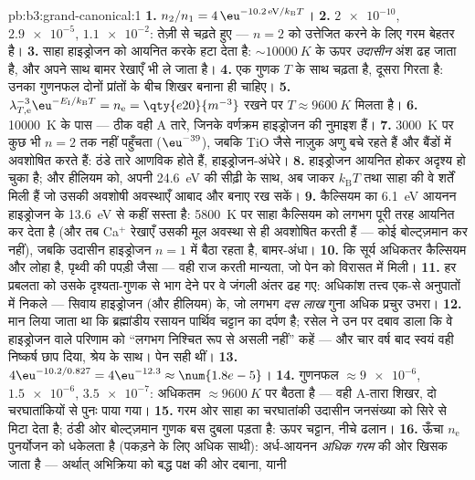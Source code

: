 \begin{solution}{pb:b3:grand-canonical:1}
\textbf{1.} $n_2/n_1 = 4\,\eu^{-10.2\,\text{eV}/k_{\text{B}}T}$।
\textbf{2.} $\num{2e-10}$, $\num{2.9e-5}$, $\num{1.1e-2}$: तेज़ी से
चढ़ते हुए --- $n = 2$ को उत्तेजित करने के लिए गरम बेहतर है।
\textbf{3.} साहा हाइड्रोजन को आयनित करके हटा देता है:
$\sim\qty{10000}{K}$ के ऊपर \emph{उदासीन} अंश ढह जाता है, और अपने
साथ बामर रेखाएँ भी ले जाता है।
\textbf{4.} एक गुणक $T$ के साथ चढ़ता है, दूसरा गिरता है: उनका
गुणनफल दोनों प्रांतों के बीच शिखर बनाना ही चाहिए।
\textbf{5.} $\lambda_{T,\text{e}}^{-3}\eu^{-E_{\text{I}}/
k_{\text{B}}T} = n_{\text{e}} = \qty{e20}{m^{-3}}$ रखने पर $T
\approx \qty{9600}{K}$ मिलता है।
\textbf{6.} \qty{10000}{K} के पास --- ठीक वही A तारे, जिनके
वर्णक्रम हाइड्रोजन की नुमाइश हैं।
\textbf{7.} \qty{3000}{K} पर कुछ भी $n = 2$ तक नहीं पहुँचता
($\eu^{-39}$), जबकि TiO जैसे नाज़ुक अणु बचे रहते हैं और
बैंडों में अवशोषित करते हैं: ठंडे तारे आणविक होते हैं,
हाइड्रोजन-अंधेरे।
\textbf{8.} हाइड्रोजन आयनित होकर अदृश्य हो चुका है; और हीलियम को,
अपनी \qty{24.6}{eV} की सीढ़ी के साथ, अब जाकर $k_{\text{B}}T$ तथा
साहा की वे शर्तें मिली हैं जो उसकी अवशोषी अवस्थाएँ आबाद और बनाए रख
सकें।
\textbf{9.} कैल्सियम का \qty{6.1}{eV} आयनन हाइड्रोजन के
\qty{13.6}{eV} से कहीं सस्ता है: \qty{5800}{K} पर साहा कैल्सियम को
लगभग पूरी तरह आयनित कर देता है (और तब Ca$^+$ रेखाएँ उसकी
मूल अवस्था से ही अवशोषित करती हैं --- कोई बोल्ट्ज़मान कर नहीं),
जबकि उदासीन हाइड्रोजन $n = 1$ में बैठा रहता है, बामर-अंधा।
\textbf{10.} कि सूर्य अधिकतर कैल्सियम और लोहा है, पृथ्वी की पपड़ी
जैसा --- वही राज करती मान्यता, जो पेन को विरासत में मिली।
\textbf{11.} हर प्रबलता को उसके दृश्यता-गुणक से भाग देने पर वे
जंगली अंतर ढह गए: अधिकांश तत्त्व एक-से अनुपातों में निकले ---
सिवाय हाइड्रोजन (और हीलियम) के, जो लगभग \emph{दस लाख} गुना अधिक
प्रचुर उभरा।
\textbf{12.} मान लिया जाता था कि ब्रह्मांडीय रसायन पार्थिव चट्टान
का दर्पण है; रसेल ने उन पर दबाव डाला कि वे हाइड्रोजन वाले परिणाम को
``लगभग निश्चित रूप से असली नहीं'' कहें --- और चार वर्ष बाद स्वयं
वही निष्कर्ष छाप दिया, श्रेय के साथ। पेन सही थीं।
\textbf{13.} $4\eu^{-10.2/0.827} = 4\eu^{-12.3} \approx
\num{1.8e-5}$।
\textbf{14.} गुणनफल $\approx \num{9e-6}$, $\num{1.5e-6}$,
$\num{3.5e-7}$: अधिकतम $\approx\qty{9600}{K}$ पर बैठता है --- वही
A-तारा शिखर, दो चरघातांकियों से पुनः पाया गया।
\textbf{15.} गरम ओर साहा का चरघातांकी उदासीन जनसंख्या को सिरे से
मिटा देता है; ठंडी ओर बोल्ट्ज़मान गुणक बस दुबला पड़ता है: ऊपर
चट्टान, नीचे ढलान।
\textbf{16.} ऊँचा $n_{\text{e}}$ पुनर्योजन को धकेलता है (पकड़ने के
लिए अधिक साथी): अर्ध-आयनन \emph{अधिक गरम} की ओर खिसक जाता है ---
अर्थात् अभिक्रिया को बद्ध पक्ष की ओर दबाना, यानी

\end{solution}
